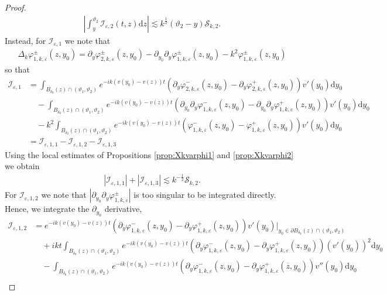 \documentclass[11pt,reqno]{amsproc}
\theoremstyle{definition}
\numberwithin{equation}{section}
\newcommand{\cI}{{\mathcal I}}
\newcommand{\cS}{{\mathcal S}}
\renewcommand{\d}{\mathrm{d}}
\newcommand{\ep}{\varepsilon}
\begin{document}
\begin{proof}
\begin{align*}
\left| \int_y^{\vartheta_2}\cI_{\ep,2}(t,z) \d z  \right| \lesssim k^\frac12(\vartheta_2-y)\cS_{k,2}.
\end{align*}
Instead, for $\cI_{\ep,1}$ we note that
\begin{align*}
\Delta_k\varphi_{1,k,\ep}^\pm(z,y_0) = \partial_y\varphi_{2,k,\ep}^\pm(z,y_0) - \partial_{y_0}\partial_y\varphi_{1,k,\ep}^\pm(z,y_0) - k^2\varphi_{1,k,\ep}^\pm(z,y_0)
\end{align*}
so that
\begin{align*}
\cI_{\ep,1} &= \int_{B_{\delta_0}(z)\cap (\vartheta_1,\vartheta_2)} e^{-ik(v(y_0)-v(z))t}\left( \partial_y\varphi_{2,k,\ep}^-(z,y_0) - \partial_y\varphi_{2,k,\ep}^+(z,y_0) \right) v'(y_0) \d y_0 \\ 
&\quad - \int_{B_{\delta_0}(z)\cap (\vartheta_1,\vartheta_2)} e^{-ik(v(y_0)-v(z))t}\left( \partial_{y_0}\partial_y\varphi_{1,k,\ep}^-(z,y_0) - \partial_{y_0}\partial_y\varphi_{1,k,\ep}^+(z,y_0) \right) v'(y_0) \d y_0 \\
&\quad - k^2\int_{B_{\delta_0}(z)\cap (\vartheta_1,\vartheta_2)} e^{-ik(v(y_0)-v(z))t}\left( \varphi_{1,k,\ep}^-(z,y_0) - \varphi_{1,k,\ep}^+(z,y_0) \right) v'(y_0) \d y_0 \\
&= \cI_{\ep,1,1} - \cI_{\ep,1,2} - \cI_{\ep,1,3}
\end{align*}
Using the local estimates of Propositions \ref{prop:Xkvarphi1} and \ref{prop:Xkvarphi2} we obtain
\begin{align*}
\left| \cI_{\ep,1,1} \right| + \left| \cI_{\ep,1,3} \right| \lesssim k^{-\frac12}\cS_{k,2}.
\end{align*}
For $\cI_{\ep,1,2}$ we note that $|\partial_{y_0}\partial_y\varphi_{1,k,\ep}^\pm |$ is too singular to be integrated directly. Hence, we integrate the $\partial_{y_0}$ derivative, 
\begin{align*}
\cI_{\ep,1,2} &=  e^{-ik(v(y_0)-v(z))t}\left( \partial_y\varphi_{1,k,\ep}^-(z,y_0) - \partial_y\varphi_{1,k,\ep}^+(z,y_0) \right) v'(y_0) \Big|_{y_0\in \partial B_{\delta_0}(z)\cap (\vartheta_1,\vartheta_2)} \\
&\quad + ikt \int_{B_{\delta_0}(z)\cap (\vartheta_1,\vartheta_2)} e^{-ik(v(y_0)-v(z))t}\left( \partial_y\varphi_{1,k,\ep}^-(z,y_0) - \partial_y\varphi_{1,k,\ep}^+(z,y_0) \right) (v'(y_0))^2 \d y_0 \\
&\quad - \int_{B_{\delta_0}(z)\cap (\vartheta_1,\vartheta_2)} e^{-ik(v(y_0)-v(z))t}\left( \partial_y\varphi_{1,k,\ep}^-(z,y_0) - \partial_y\varphi_{1,k,\ep}^+(z,y_0) \right) v''(y_0) \d y_0 \\

\end{align*}
\end{proof}
\end{document}
